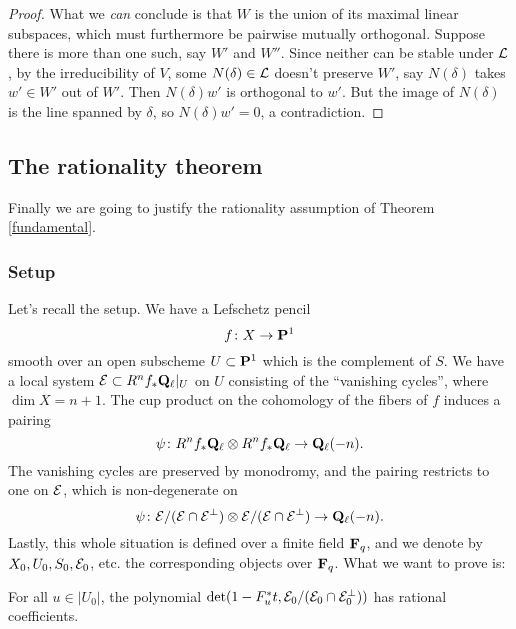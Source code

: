 \begin{proof}
What we \emph{can} conclude is that $W$ is the union of its maximal linear subspaces, which must furthermore be pairwise mutually orthogonal. Suppose there is more than one such, say $W'$ and $W''$. Since neither can be stable under $\mathcal{L}$, by the irreducibility of $V$, some $N(\delta) \in \mathcal{L}$ doesn't preserve $W'$, say $N(\delta) $ takes $w' \in W'$ out of $W'$. Then $N(\delta) w'$ is orthogonal to $w'$. But the image of $N(\delta)$ is the line spanned by $\delta$, so $N(\delta) w' = 0$, a contradiction. 


\end{proof}


\subsection{The rationality theorem}
Finally we are going to justify the rationality assumption of Theorem \ref{fundamental}. 


\subsubsection{Setup} Let's recall the setup. We have a Lefschetz pencil 
\[
f \colon X \rightarrow \mathbf{P}^1
\]
smooth over an open subscheme $U \subset \mathbf{P}^1$ which is the complement of $S$. We have a local system $\mathcal{E} \subset R^n f_* \mathbf{Q}_{\ell}|_U$ on $U$ consisting of the ``vanishing cycles'', where $\dim X = n+1$. The cup product on the cohomology of the fibers of $f$ induces a pairing
\[
\psi \colon R^n f_* \mathbf{Q}_{\ell} \otimes R^n f_* \mathbf{Q}_{\ell} \rightarrow \mathbf{Q}_{\ell}(-n).
\]
The vanishing cycles are preserved by monodromy, and the pairing restricts to one on $\mathcal{E}$, which is non-degenerate on 
\[
\psi \colon \mathcal{E}/(\mathcal{E} \cap \mathcal{E}^{\perp}) \otimes \mathcal{E}/(\mathcal{E} \cap \mathcal{E}^{\perp}) \rightarrow \mathbf{Q}_{\ell}(-n).
\]
Lastly, this whole situation is defined over a finite field $\mathbf{F}_q$, and we denote by $X_0, U_0, S_0, \mathcal{E}_0$, etc. the corresponding objects over $\mathbf{F}_q$. What we want to prove is:

\begin{thm}\label{rationality}
For all $u \in |U_0|$, the polynomial $\det (1-F_u^* t, \mathcal{E}_0/(\mathcal{E}_0 \cap \mathcal{E}_0^{\perp}))$ has rational coefficients. 
\end{thm}


